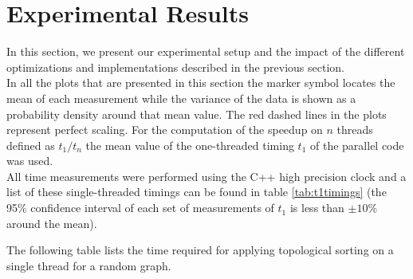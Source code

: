 \section{Experimental Results}\label{sec:exp}
%
In this section, we present our experimental setup and the impact of the different optimizations and implementations described in the previous section. \\
%
In all the plots that are presented in this section the marker symbol locates the mean of each measurement while the variance of the data is shown as a probability density around that mean value.
The red dashed lines in the plots represent perfect scaling.
For the computation of the speedup on $n$ threads defined as $t_1/t_n$ the mean value of the one-threaded timing $t_1$ of the parallel code was used. \\
All time measurements were performed using the C++ high precision clock and a list of these single-threaded timings can be found in table \ref{tab:t1timings} (the 95\% confidence interval of each set of measurements of $t_1$ is less than $\pm 10\%$ around the mean). \\
\par\medskip
The following table lists the time required for applying topological sorting on a single thread for a random graph.

